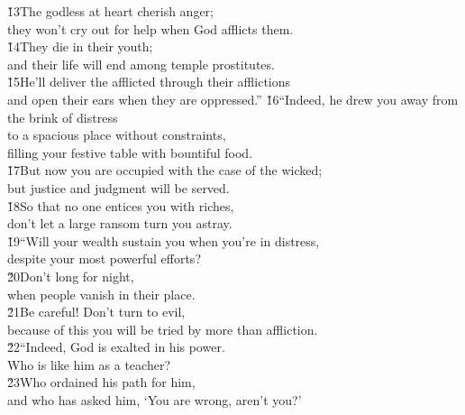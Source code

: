 \begin{poetry}
\poeml \v{13}The godless at heart cherish anger; \\
\poemll    they won't cry out for help when God afflicts them. \\
\poeml \v{14}They die in their youth; \\
\poemll    and their life will end among temple prostitutes. \\
\poeml \v{15}He'll deliver the afflicted through their afflictions \\
\poemll    and open their ears when they are oppressed.''
\poeml \v{16}``Indeed, he drew you away from the brink of distress \\
\poemll    to a spacious place without constraints, \\
\poemlll       filling your festive table with bountiful food. \\
\poeml \v{17}But now you are occupied with the case of the wicked; \\
\poemll    but justice and judgment will be served. \\
\poeml \v{18}So that no one entices you with riches, \\
\poemll    don't let a large ransom turn you astray. \\
\poeml \v{19}``Will your wealth sustain you when you're in distress, \\
\poemll    despite your most powerful efforts? \\
\poeml \v{20}Don't long for night, \\
\poemll    when people vanish in their place. \\
\poeml \v{21}Be careful! Don't turn to evil, \\
\poemll    because of this you will be tried by more than affliction. \\
\poeml \v{22}``Indeed, God is exalted in his power. \\
\poemll    Who is like him as a teacher? \\
\poeml \v{23}Who ordained his path for him, \\
\poemll    and who has asked him, `You are wrong, aren't you?' \\

\end{poetry}
